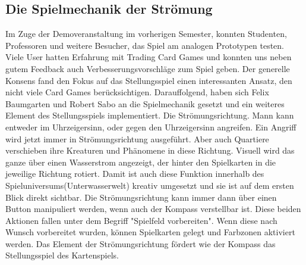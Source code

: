 \subsection{Die Spielmechanik der Strömung}
Im Zuge der Demoveranstaltung im vorherigen Semester, konnten Studenten, Professoren und weitere Besucher, das Spiel am analogen Prototypen testen. Viele User hatten Erfahrung mit Trading Card Games und konnten uns neben gutem Feedback auch Verbesserungsvorschläge zum Spiel geben. Der generelle Konsens fand den Fokus auf das Stellungsspiel einen interessanten Ansatz, den nicht viele Card Games berücksichtigen. Darauffolgend, haben sich Felix Baumgarten und Robert Sabo an die Spielmechanik gesetzt und ein weiteres Element des Stellungsspiels implementiert. Die Strömungsrichtung. Mann kann entweder im Uhrzeigersinn, oder gegen den Uhrzeigersinn angreifen. Ein Angriff wird jetzt immer in Strömungsrichtung ausgeführt. Aber auch Quartiere verschieben ihre Kreaturen und Phänomene in diese Richtung. Visuell wird das ganze über einen Wasserstrom angezeigt, der hinter den Spielkarten in die jeweilige Richtung rotiert. Damit ist auch diese Funktion innerhalb des Spieluniversums(Unterwasserwelt) kreativ umgesetzt und sie ist auf dem ersten Blick direkt sichtbar. Die Strömungsrichtung kann immer dann über einen Button manipuliert werden, wenn auch der Kompass verstellbar ist. Diese beiden Aktionen fallen unter dem Begriff "Spielfeld vorbereiten". Wenn diese nach Wunsch vorbereitet wurden, können Spielkarten gelegt und Farbzonen aktiviert werden. Das Element der Strömungsrichtung fördert wie der Kompass das Stellungsspiel des Kartenspiels.
